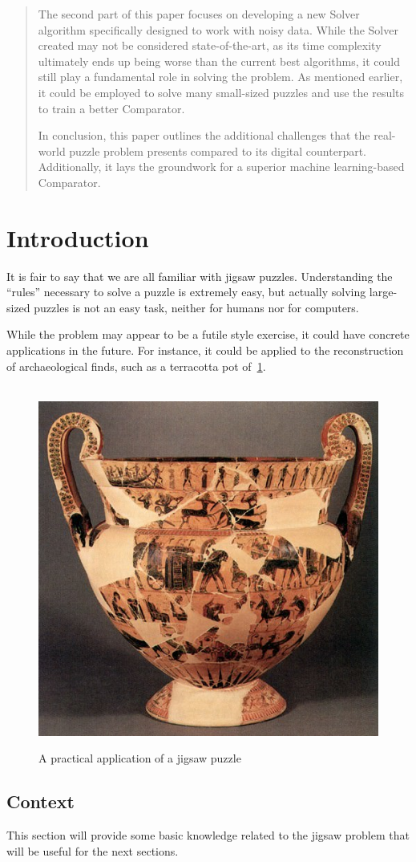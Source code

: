 \documentclass{article}
\begin{document}
\begin{abstract}
The second part of this paper focuses on developing a
new Solver algorithm specifically designed to work with noisy data.
While the Solver created may not be considered state-of-the-art,
as its time complexity ultimately ends up being worse than the current
best algorithms, it could still play a fundamental role in solving the problem.
As mentioned earlier, it could be employed to solve many small-sized
puzzles and use the results to train a better Comparator.

In conclusion, this paper outlines the additional challenges that the real-world
puzzle problem presents compared to its digital counterpart.
Additionally, it lays the groundwork for a superior machine learning-based Comparator.

\end{abstract}

\section{Introduction}
It is fair to say that we are all familiar with jigsaw puzzles.
Understanding the ``rules'' necessary to solve a puzzle is
extremely easy, but actually solving large-sized puzzles
is not an easy task, neither for humans nor for computers.

While the problem may appear to be a futile style exercise,
it could have concrete applications in the future. For instance,
it could be applied to the reconstruction of archaeological finds,
such as a terracotta pot of~\cref{fig:pot}.

\begin{figure}[h]
  \caption{A practical application of a jigsaw puzzle}~\label{fig:pot}
  \includegraphics[height=0.25\textwidth]{pictures/terracotta_pot.jpg}
  \centering
\end{figure}


\subsection{Context}
This section will provide some basic knowledge
related to the jigsaw problem that will be useful
  for the next sections.
\end{document}
